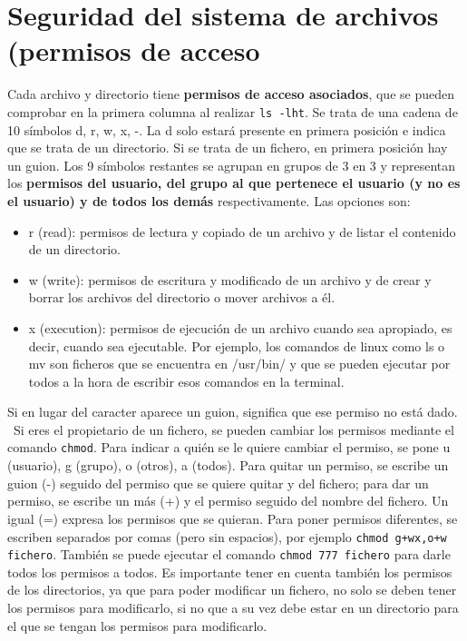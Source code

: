 \documentclass{config/apuntes}
\begin{document}
\section{Seguridad del sistema de archivos (permisos de acceso}
Cada archivo y directorio tiene \textbf{permisos de acceso asociados}, que se pueden comprobar en la primera columna al realizar \texttt{ls -lht}. Se trata de una cadena de 10 símbolos d, r, w, x, -. La d solo estará presente en primera posición e indica que se trata de un directorio. Si se trata de un fichero, en primera posición hay un guion. Los 9 símbolos restantes se agrupan en grupos de 3 en 3 y representan los \textbf{permisos del usuario, del grupo al que pertenece el usuario (y no es el usuario) y de todos los demás} respectivamente. Las opciones son:
\begin{itemize}
\item r (read): permisos de lectura y copiado de un archivo y de listar el contenido de un directorio.
\item w (write): permisos de escritura y modificado de un archivo y de crear y borrar los archivos del directorio o mover archivos a él.
\item x (execution): permisos de ejecución de un archivo cuando sea apropiado, es decir, cuando sea ejecutable. Por ejemplo, los comandos de linux como ls o mv son ficheros que se encuentra en /usr/bin/ y que se pueden ejecutar por todos a la hora de escribir esos comandos en la terminal. 
\end{itemize}
Si en lugar del caracter aparece un guion, significa que ese permiso no está dado.  \ Si eres el propietario de un fichero, se pueden cambiar los permisos mediante el comando \texttt{chmod}. Para indicar a quién se le quiere cambiar el permiso, se pone u (usuario), g (grupo), o (otros), a (todos). Para quitar un permiso, se escribe un guion (-) seguido del permiso que se quiere quitar y del fichero; para dar un permiso, se escribe un más (+) y el permiso seguido del nombre del fichero. Un igual (=) expresa los permisos que se quieran. Para poner permisos diferentes, se escriben separados por comas (pero sin espacios), por ejemplo \texttt{chmod g+wx,o+w fichero}. También se puede ejecutar el comando \texttt{chmod 777 fichero} para darle todos los permisos a todos. Es importante tener en cuenta también los permisos de los directorios, ya que para poder modificar un fichero, no solo se deben tener los permisos para modificarlo, si no que a su vez debe estar en un directorio para el que se tengan los permisos para modificarlo.
\end{document}
